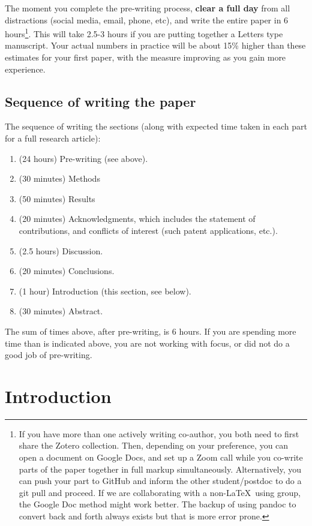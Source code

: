 \documentclass[12 pt]{article}
\begin{document}
The moment you complete the pre-writing process, \textbf{clear a full day} from all distractions (social media, email, phone, etc), and write the entire paper in 6 hours\footnote{If you have more than one actively writing co-author, you both need to first share the Zotero collection. Then, depending on your preference, you can open a document on Google Docs, and set up a Zoom call while you co-write parts of the paper together in full markup simultaneously. Alternatively, you can push your part to GitHub and inform the other student/postdoc to do a git pull and proceed. If we are collaborating with a non-\LaTeX\ using group, the Google Doc method might work better. The backup of using pandoc to convert back and forth always exists but that is more error prone.}. This will take 2.5-3 hours if you are putting together a Letters type manuscript. Your actual numbers in practice will be about 15\% higher than these estimates for your first paper, with the measure improving as you gain more experience.

\subsection{Sequence of writing the paper}

The sequence of writing the sections (along with expected time taken in each part for a full research article):

\begin{enumerate}
\item (24 hours) Pre-writing (see above).
\item (30 minutes) Methods
\item (50 minutes) Results
\item (20 minutes) Acknowledgments, which includes the statement of contributions, and conflicts of interest (such patent applications, etc.).
\item (2.5 hours) Discussion.
\item (20 minutes) Conclusions.
\item (1 hour) Introduction (this section, see below).
\item (30 minutes) Abstract.
\end{enumerate}

The sum of times above, after pre-writing, is 6 hours. If you are spending more time than is indicated above, you are not working with focus, or did not do a good job of pre-writing.

\section{Introduction}
\label{sec:introduction}
\end{document}
